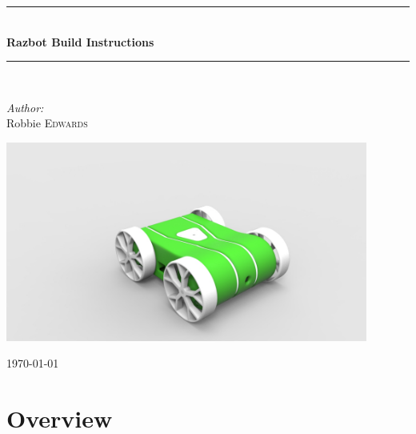 \documentclass[12pt,titlepage,oneside]{memoir}
\newcommand{\HRule}{\rule{\linewidth}{0.5mm}}
\begin{document}
\begin{titlingpage}
\begin{center}


\vspace{50mm}
\HRule \\[0.4cm]
{ \huge \bfseries Razbot Build Instructions}\\[0.4cm]

\HRule \\[1.5cm]

\begin{minipage}{0.4\textwidth}
\begin{flushleft} \large
\emph{Author:}\\
Robbie \textsc{Edwards}\\
\end{flushleft}
\end{minipage}
\vfill
\includegraphics[width=450px]{render/pibot2.jpg}
\vspace*{1cm}

{\large \today}

\end{center}
\end{titlingpage}



\mainmatter
{}

\chapter{Overview}
\end{document}
